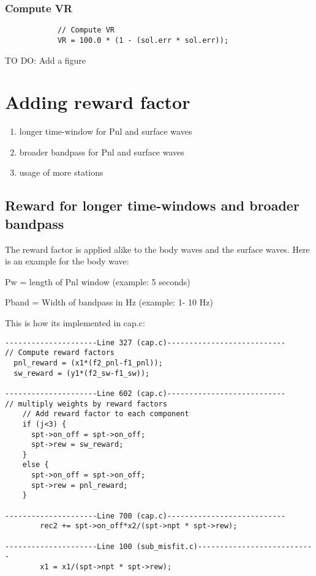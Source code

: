 \documentclass[11pt,titlepage,fleqn]{article}
\begin{document}
\subsubsection*{Compute VR}
\begin{verbatim}
            // Compute VR
            VR = 100.0 * (1 - (sol.err * sol.err));
\end{verbatim}

TO DO: Add a figure

\section{Adding reward factor}

\begin{enumerate}
\item longer time-window for Pnl and surface waves
\item broader bandpass for Pnl and surface waves
\item usage of more stations
\end{enumerate}

\subsection{Reward for longer time-windows and broader bandpass}
The reward factor is applied alike to the body waves and the surface waves. Here is an example for the body wave:

\begin{description}
\item Pw = length of Pnl window (example: 5 seconds) 
\item Pband = Width of bandpass in Hz (example: 1- 10 Hz) 
\end{description}


This is how its implemented in cap.c:
\begin{verbatim}
---------------------Line 327 (cap.c)---------------------------
// Compute reward factors
  pnl_reward = (x1*(f2_pnl-f1_pnl));
  sw_reward = (y1*(f2_sw-f1_sw));

---------------------Line 602 (cap.c)---------------------------
// multiply weights by reward factors
	// Add reward factor to each component
	if (j<3) {
	  spt->on_off = spt->on_off;
	  spt->rew = sw_reward;
	}
	else {
	  spt->on_off = spt->on_off;
	  spt->rew = pnl_reward;
	}

---------------------Line 700 (cap.c)---------------------------
        rec2 += spt->on_off*x2/(spt->npt * spt->rew);

---------------------Line 100 (sub_misfit.c)---------------------------
        x1 = x1/(spt->npt * spt->rew);

\end{verbatim}
\end{document}
